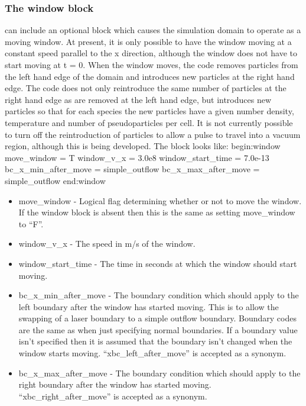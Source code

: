 \documentclass[12pt,a4paper]{article}
\newcommand{\EPOCH}{{\color{warwickdark}\fontfamily{phv}\selectfont{EPOCH}}}
\newenvironment{boxverbatim}{\lboxverbatim{none}}{\endlboxverbatim}
\begin{document}
\subsubsection{The window block}
{\EPOCH} can include an optional block which causes the simulation domain to
operate as a moving window. At present, it is only possible to have the window
moving at a constant speed parallel to the x direction, although the window
does not have to start moving at t = 0. When the window moves, the code removes
particles from the left hand edge of the domain and introduces new particles
at the right hand edge. The code does not only reintroduce the same number of
particles at the right hand edge as are removed at the left hand edge, but
introduces new particles so that for each species the new particles have a
given number density, temperature and number of pseudoparticles per cell. It
is not currently possible to turn off the reintroduction of particles to allow
a pulse to travel into a vacuum region, although this is being developed. The
block looks like:
\begin{boxverbatim}
begin:window
   move_window = T
   window_v_x = 3.0e8
   window_start_time = 7.0e-13
   bc_x_min_after_move = simple_outflow
   bc_x_max_after_move = simple_outflow
end:window
\end{boxverbatim}

\begin{itemize}
\item move\_window - Logical flag determining whether or not to move the
  window. If the window block is absent then this is the same as setting
  move\_window to ``F''.
\item window\_v\_x - The speed in m/s of the window.
\item window\_start\_time - The time in seconds at which the window should
  start moving.
\item bc\_x\_min\_after\_move - The boundary condition which should apply to
  the left boundary after the window has started moving. This is to allow the
  swapping of a laser boundary to a simple outflow boundary. Boundary codes
  are the same as when just specifying normal boundaries. If a boundary value
  isn't specified then it is assumed that the boundary isn't changed when the
  window starts moving. ``xbc\_left\_after\_move'' is accepted as a synonym.
\item bc\_x\_max\_after\_move - The boundary condition which should apply to
  the right boundary after the window has started moving.
  ``xbc\_right\_after\_move'' is accepted as a synonym.
\end{itemize}
\end{document}
